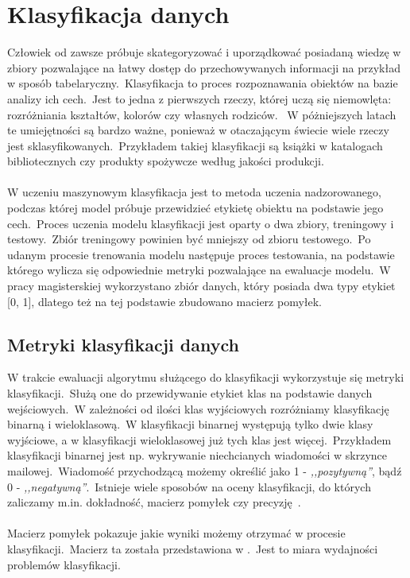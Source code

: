 \chapter{Klasyfikacja danych}

 Człowiek od zawsze próbuje skategoryzować i uporządkować posiadaną wiedzę w zbiory pozwalające na łatwy dostęp do przechowywanych informacji na przykład w sposób tabelaryczny.\ Klasyfikacja to proces rozpoznawania obiektów na bazie analizy ich cech.\ Jest to jedna z pierwszych rzeczy, której uczą się niemowlęta: rozróżniania kształtów, kolorów czy własnych rodziców. \ W póżniejszych latach te umiejętności są bardzo ważne, ponieważ w otaczającym świecie wiele rzeczy jest sklasyfikowanych.\ Przykładem takiej klasyfikacji są książki w katalogach bibliotecznych czy produkty spożywcze według jakości produkcji.
\\ \\
W uczeniu maszynowym klasyfikacja jest to metoda uczenia nadzorowanego, podczas której model próbuje przewidzieć etykietę obiektu na podstawie jego cech.\ Proces uczenia modelu klasyfikacji jest oparty o dwa zbiory, treningowy i testowy.\ Zbiór treningowy powinien być mniejszy od zbioru testowego.\ Po udanym procesie trenowania modelu następuje proces testowania, na podstawie którego wylicza się odpowiednie metryki pozwalające na ewaluacje modelu.\ W pracy magisterskiej wykorzystano zbiór danych, który posiada dwa typy etykiet [0, 1], dlatego też na tej podstawie zbudowano macierz pomyłek.

\section{Metryki klasyfikacji danych}
W trakcie ewaluacji algorytmu służącego do klasyfikacji wykorzystuje się metryki klasyfikacji.\ Służą one do przewidywanie etykiet klas na podstawie danych wejściowych.\ W zależności od ilości klas wyjściowych rozróżniamy klasyfikację binarną i wieloklasową.\ W klasyfikacji binarnej występują tylko dwie klasy wyjściowe, a w klasyfikacji wieloklasowej już tych klas jest więcej.\ Przykładem klasyfikacji binarnej jest np. wykrywanie niechcianych wiadomości w skrzynce mailowej.\ Wiadomość przychodzącą możemy określić jako 1 - \textit{,,pozytywną''}, bądź 0 - \textit{,,negatywną''}.\ Istnieje wiele sposobów na oceny klasyfikacji, do których zaliczamy m.in. dokładność, macierz pomyłek czy precyzję~\cite{Agrawal2024}.
\\ \\
Macierz pomyłek pokazuje jakie wyniki możemy otrzymać w procesie klasyfikacji.\ Macierz ta została przedstawiona w .\ Jest to miara wydajności problemów klasyfikacji.

